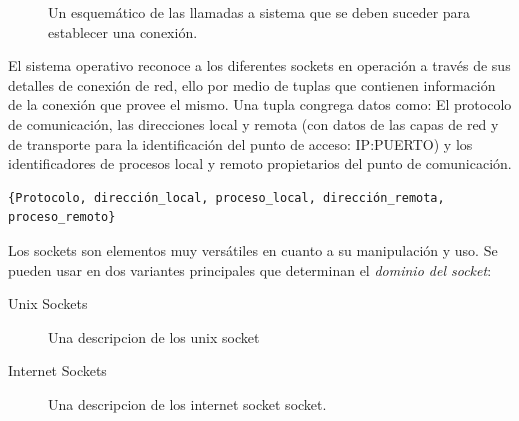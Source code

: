 \begin{figure}[h!]
	\centering
	\caption{Un esquemático de las llamadas a sistema que se deben suceder para establecer una conexión.}
	\label{fig:socketHandshake}
\end{figure}

El sistema operativo reconoce a los diferentes sockets en operación a través de sus detalles de conexión de red, ello por medio de tuplas que contienen información de la conexión que provee el mismo. Una tupla congrega datos como: El protocolo de comunicación, las direcciones local y remota (con datos de las capas de red y de transporte para la identificación del punto de acceso: IP:PUERTO) y los identificadores de procesos local y remoto propietarios del punto de comunicación.

\begin{verbatim}
{Protocolo, dirección_local, proceso_local, dirección_remota, proceso_remoto}
\end{verbatim}

Los sockets son elementos muy versátiles en cuanto a su manipulación y uso. Se pueden usar en dos variantes principales que determinan el \emph{dominio del socket}:
\begin{description}
\item[Unix Sockets] Una descripcion de los unix socket
\item[Internet Sockets] Una descripcion de los internet socket socket.
\end{description}


